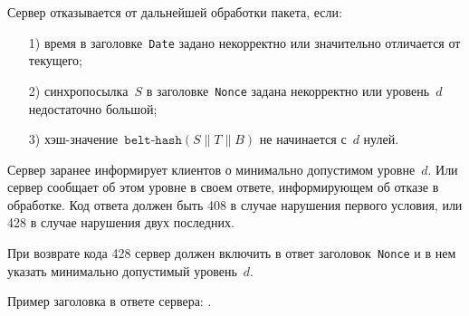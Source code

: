 Сервер отказывается от дальнейшей обработки пакета, если:
\begin{enumerate}
\item[1)] 
время в заголовке~\texttt{Date} задано некорректно или значительно 
отличается от текущего;
\item[2)] 
синхропосылка~$S$ в заголовке~\texttt{Nonce} задана некорректно или 
уровень~$d$ недостаточно большой;
\item[3)] 
хэш-значение~$\texttt{belt-hash}(S\parallel T\parallel B)$ не начинается 
с~$d$ нулей.
\end{enumerate}

Сервер заранее информирует клиентов о минимально допустимом уровне~$d$.
Или сервер сообщает об этом уровне в своем ответе, информирующем об отказе 
в обработке. Код ответа должен быть 408 в случае нарушения первого 
условия, или 428 в случае нарушения двух последних.

При возврате кода 428 сервер должен включить в ответ 
заголовок~\texttt{Nonce} и в нем указать минимально допустимый 
уровень~$d$.

Пример заголовка в ответе сервера: .

